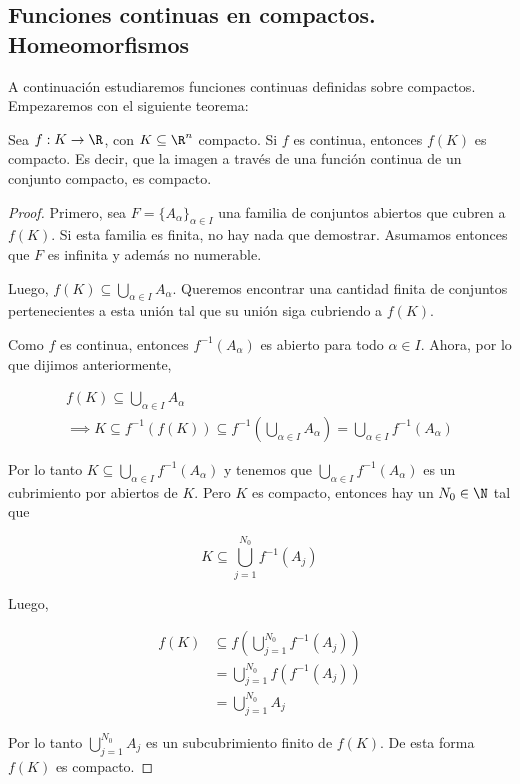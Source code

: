 \subsection{Funciones continuas en compactos. Homeomorfismos}

A continuación estudiaremos funciones continuas definidas sobre compactos. Empezaremos con el siguiente teorema:

\begin{teo}
    Sea $f: K \rightarrow \R$, con $K \subseteq \R^n$ compacto. Si $f$ es continua, entonces $f(K)$ es compacto. Es decir, que la imagen a través de una función continua de un conjunto compacto, es compacto.
\end{teo}

\begin{proof}
    Primero, sea $F = \{A_{\alpha}\}_{\alpha \in I}$ una familia de conjuntos abiertos que cubren a $f(K)$. Si esta familia es finita, no hay nada que demostrar. Asumamos entonces que $F$ es infinita y además no numerable.
    
    Luego, $f(K) \subseteq \bigcup_{\alpha \in I}A_{\alpha}$. Queremos encontrar una cantidad finita de conjuntos pertenecientes a esta unión tal que su unión siga cubriendo a $f(K)$.
    
    Como $f$ es continua, entonces $f^{-1}(A_{\alpha})$ es abierto para todo $\alpha \in I$. Ahora, por lo que dijimos anteriormente,
    
    \begin{gather*}
        f(K) \subseteq \bigcup_{\alpha \in I}A_{\alpha} \\
        \implies K \subseteq f^{-1}\left( f(K) \right) \subseteq f^{-1} \left( \bigcup_{\alpha \in I} A_{\alpha} \right) = \bigcup_{\alpha \in I} f^{-1}(A_{\alpha})
    \end{gather*}
    
    Por lo tanto $K \subseteq \bigcup_{\alpha \in I} f^{-1}(A_{\alpha})$ y tenemos que $\bigcup_{\alpha \in I} f^{-1}(A_{\alpha})$ es un cubrimiento por abiertos de $K$. Pero $K$ es compacto, entonces hay un $N_0 \in \N$ tal que
    
    \[
    K \subseteq \bigcup_{j=1}^{N_0} f^{-1} (A_j)
    \]
    
    Luego,
    
    \begin{align*}
        f(K) &\subseteq f\left( \bigcup_{j=1}^{N_0} f^{-1} (A_j) \right) \\
        &= \bigcup_{j=1}^{N_0} f\left(f^{-1} (A_j)\right) \\
        &= \bigcup_{j=1}^{N_0} A_j
    \end{align*}
    
    Por lo tanto $\bigcup_{j=1}^{N_0} A_j$ es un subcubrimiento finito de $f(K)$. De esta forma $f(K)$ es compacto.
\end{proof}

